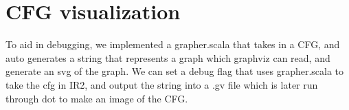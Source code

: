 \documentclass[11pt]{article}
\begin{document}
\section{CFG visualization}
\label{sec-4}

    To aid in debugging, we implemented a grapher.scala that takes in a CFG,
    and auto generates a string that represents a graph which graphviz can read, and generate an svg of the graph.
    We can set a debug flag that uses grapher.scala to take the cfg in IR2, and output the string into a .gv file which is later run through dot to make an
    image of the CFG.
\end{document}
